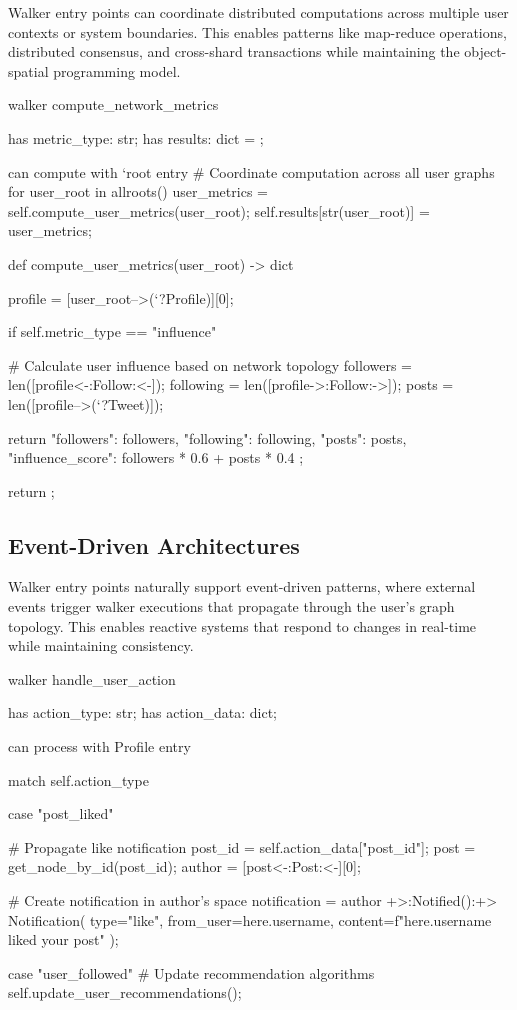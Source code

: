 Walker entry points can coordinate distributed computations across multiple user contexts or system boundaries. This enables patterns like map-reduce operations, distributed consensus, and cross-shard transactions while maintaining the object-spatial programming model.

\begin{jacblock}
walker compute_network_metrics {
    has metric_type: str;
    has results: dict = {};

    can compute with `root entry {
        # Coordinate computation across all user graphs
        for user_root in allroots() {
            user_metrics = self.compute_user_metrics(user_root);
            self.results[str(user_root)] = user_metrics;
        }
    }

    def compute_user_metrics(user_root) -> dict {
        profile = [user_root-->(`?Profile)][0];

        if self.metric_type == "influence" {
            # Calculate user influence based on network topology
            followers = len([profile<-:Follow:<-]);
            following = len([profile->:Follow:->]);
            posts = len([profile-->(`?Tweet)]);

            return {
                "followers": followers,
                "following": following,
                "posts": posts,
                "influence_score": followers * 0.6 + posts * 0.4
            };
        }

        return {};
    }
}
\end{jacblock}

\subsection{Event-Driven Architectures}

Walker entry points naturally support event-driven patterns, where external events trigger walker executions that propagate through the user's graph topology. This enables reactive systems that respond to changes in real-time while maintaining consistency.

\begin{jacblock}
walker handle_user_action {
    has action_type: str;
    has action_data: dict;

    can process with Profile entry {
        match self.action_type {
            case "post_liked" {
                # Propagate like notification
                post_id = self.action_data["post_id"];
                post = get_node_by_id(post_id);
                author = [post<-:Post:<-][0];

                # Create notification in author's space
                notification = author +>:Notified():+> Notification(
                    type="like",
                    from_user=here.username,
                    content=f"{here.username} liked your post"
                );
            }

            case "user_followed" {
                # Update recommendation algorithms
                self.update_user_recommendations();
            }
        }
    }
}
\end{jacblock}


